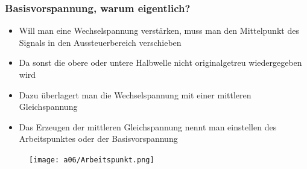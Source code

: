 \begin{frame}
\begin{columns}
\begin{center}
\begin{figure}
        \label{fig:spannungsteiler}
      \end{figure}
    \end{center}
  \end{columns}
\end{frame}

\begin{frame}
  \frametitle{Basisvorspannung, warum eigentlich?}
  \begin{itemize}
    \item Will man eine Wechselspannung verstärken, muss man den Mittelpunkt des Signals in den Aussteuerbereich verschieben
    \item Da sonst die obere oder untere Halbwelle nicht originalgetreu wiedergegeben wird
    \item Dazu überlagert man die Wechselspannung mit einer mittleren Gleichspannung
    \item Das Erzeugen der mittleren Gleichspannung nennt man einstellen des Arbeitspunktes oder der Basisvorspannung
  \end{itemize}
\end{frame}

\begin{frame}
  \begin{figure}
    \texttt{[image: a06/Arbeitspunkt.png]}
  \end{figure}
\end{frame}

